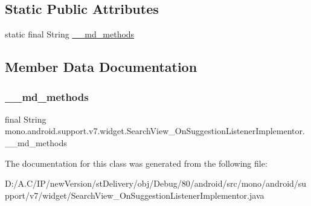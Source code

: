 \subsection*{Static Public Attributes}
\begin{DoxyCompactItemize}
\item 
static final String \hyperlink{classmono_1_1android_1_1support_1_1v7_1_1widget_1_1_search_view___on_suggestion_listener_implementor_a44a48ff09acbe6b4fd082f476212f5c7}{\+\_\+\+\_\+md\+\_\+methods}
\end{DoxyCompactItemize}


\subsection{Member Data Documentation}
\mbox{\label{classmono_1_1android_1_1support_1_1v7_1_1widget_1_1_search_view___on_suggestion_listener_implementor_a44a48ff09acbe6b4fd082f476212f5c7}} 
\subsubsection{\texorpdfstring{\+\_\+\+\_\+md\+\_\+methods}{\_\_md\_methods}}
{\footnotesize\ttfamily final String mono.\+android.\+support.\+v7.\+widget.\+Search\+View\+\_\+\+On\+Suggestion\+Listener\+Implementor.\+\_\+\+\_\+md\+\_\+methods\hspace{0.3cm}{\ttfamily [static]}}



The documentation for this class was generated from the following file\+:\begin{DoxyCompactItemize}
\item 
D\+:/\+A.\+C/\+I\+P/new\+Version/st\+Delivery/obj/\+Debug/80/android/src/mono/android/support/v7/widget/Search\+View\+\_\+\+On\+Suggestion\+Listener\+Implementor.\+java\end{DoxyCompactItemize}
